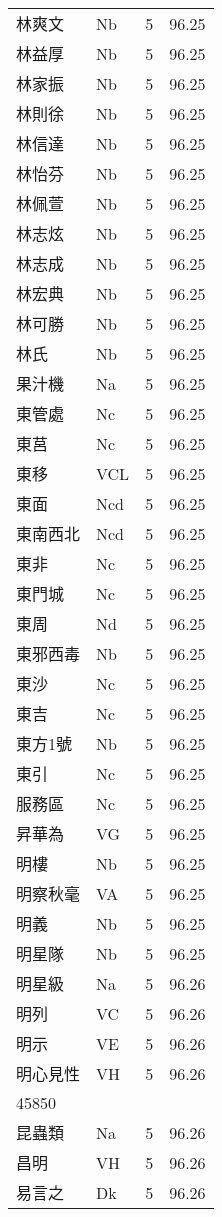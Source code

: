 \documentclass[twocolumn]{book}
\begin{document}
\begin{supertabular}{llrr}
林爽文 & Nb & 5 &  96.25\\
林益厚 & Nb & 5 &  96.25\\
林家振 & Nb & 5 &  96.25\\
林則徐 & Nb & 5 &  96.25\\
林信達 & Nb & 5 &  96.25\\
林怡芬 & Nb & 5 &  96.25\\
林佩萱 & Nb & 5 &  96.25\\
林志炫 & Nb & 5 &  96.25\\
林志成 & Nb & 5 &  96.25\\
林宏典 & Nb & 5 &  96.25\\
林可勝 & Nb & 5 &  96.25\\
林氏 & Nb & 5 &  96.25\\
果汁機 & Na & 5 &  96.25\\
東管處 & Nc & 5 &  96.25\\
東莒 & Nc & 5 &  96.25\\
東移 & VCL & 5 &  96.25\\
東面 & Ncd & 5 &  96.25\\
東南西北 & Ncd & 5 &  96.25\\
東非 & Nc & 5 &  96.25\\
東門城 & Nc & 5 &  96.25\\
東周 & Nd & 5 &  96.25\\
東邪西毒 & Nb & 5 &  96.25\\
東沙 & Nc & 5 &  96.25\\
東吉 & Nc & 5 &  96.25\\
東方1號 & Nb & 5 &  96.25\\
東引 & Nc & 5 &  96.25\\
服務區 & Nc & 5 &  96.25\\
昇華為 & VG & 5 &  96.25\\
明樓 & Nb & 5 &  96.25\\
明察秋毫 & VA & 5 &  96.25\\
明義 & Nb & 5 &  96.25\\
明星隊 & Nb & 5 &  96.25\\
明星級 & Na & 5 &  96.26\\
明列 & VC & 5 &  96.26\\
明示 & VE & 5 &  96.26\\
明心見性 & VH & 5 &  96.26\\
45850\\
昆蟲類 & Na & 5 &  96.26\\
昌明 & VH & 5 &  96.26\\
易言之 & Dk & 5 &  96.26\\

\end{supertabular}
\end{document}

